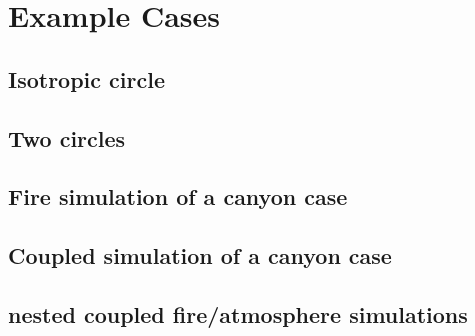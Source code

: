 \part{Example Cases}

\chapter{Isotropic circle}

\chapter{Two circles}

\chapter{Fire simulation of a canyon case}

\chapter{Coupled simulation of a canyon case}

\chapter{nested coupled fire/atmosphere simulations}